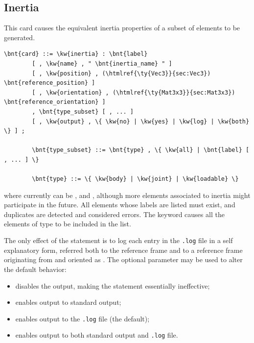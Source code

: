 \subsection{Inertia}\label{sec:EL:MISC:INERTIA}
This card causes the equivalent inertia properties of a subset
of elements to be generated.
\begin{Verbatim}[commandchars=\\\{\}]
    \bnt{card} ::= \kw{inertia} : \bnt{label}
        [ , \kw{name} , " \bnt{inertia_name} " ]
        [ , \kw{position} , (\htmlref{\ty{Vec3}}{sec:Vec3}) \bnt{reference_position} ]
        [ , \kw{orientation} , (\htmlref{\ty{Mat3x3}}{sec:Mat3x3}) \bnt{reference_orientation} ]
        , \bnt{type_subset} [ , ... ]
        [ , \kw{output} , \{ \kw{no} | \kw{yes} | \kw{log} | \kw{both} \} ] ;

        \bnt{type_subset} ::= \bnt{type} , \{ \kw{all} | \bnt{label} [ , ... ] \}

        \bnt{type} ::= \{ \kw{body} | \kw{joint} | \kw{loadable} \}
\end{Verbatim}
where  currently can be ,  and , 
although more elements associated to inertia might participate in the future.
All elements whose labels are listed must exist, and duplicates
are detected and considered errors.
The keyword  causes all the elements of type  
to be included in the list.

\noindent
The only effect of the  statement is to log
each  entry in the \texttt{.log} file in a self explanatory form,
referred both to the  reference frame and to a reference frame
originating from  and oriented 
as .
The optional parameter  may be used to alter the default 
behavior:
\begin{itemize}
\item {} disables the output, making the  
statement essentially ineffective;
\item {} enables output to standard output;
\item {} enables output to the \texttt{.log} file (the default);
\item {} enables output to both standard output and \texttt{.log} file.
\end{itemize}



